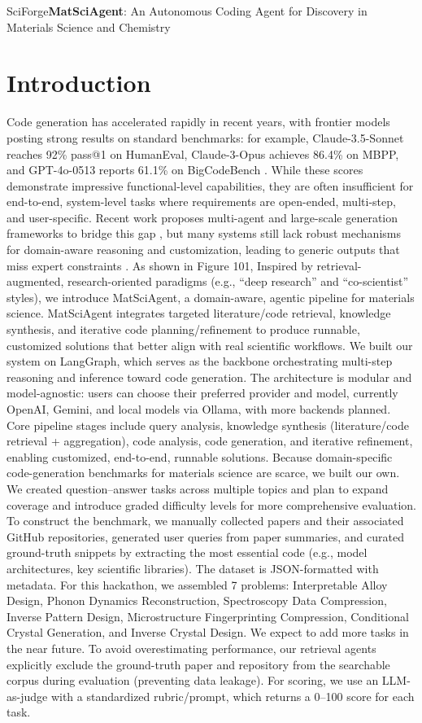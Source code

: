 \begin{teamsubmission}{SciForge}{\textbf{MatSciAgent}: An Autonomous Coding Agent for Discovery in Materials Science and Chemistry}
\section*{Introduction}
Code generation has accelerated rapidly in recent years, with frontier models posting strong results on standard benchmarks: for example, Claude-3.5-Sonnet reaches 92\% pass@1 on HumanEval, Claude-3-Opus achieves 86.4\% on MBPP, and GPT-4o-0513 reports 61.1\% on BigCodeBench \cite{jiang2024survey}. While these scores demonstrate impressive functional-level capabilities, they are often insufficient for end-to-end, system-level tasks where requirements are open-ended, multi-step, and user-specific. Recent work proposes multi-agent and large-scale generation frameworks to bridge this gap \cite{ishibashi2024self}, but many systems still lack robust mechanisms for domain-aware reasoning and customization, leading to generic outputs that miss expert constraints \cite{huang2025deep}. As shown in Figure 101, Inspired by retrieval-augmented, research-oriented paradigms (e.g., “deep research” and “co-scientist” styles), we introduce MatSciAgent, a domain-aware, agentic pipeline for materials science. MatSciAgent integrates targeted literature/code retrieval, knowledge synthesis, and iterative code planning/refinement to produce runnable, customized solutions that better align with real scientific workflows. We built our system on LangGraph, which serves as the backbone orchestrating multi-step reasoning and inference toward code generation. The architecture is modular and model-agnostic: users can choose their preferred provider and model, currently OpenAI, Gemini, and local models via Ollama, with more backends planned. Core pipeline stages include query analysis, knowledge synthesis (literature/code retrieval + aggregation), code analysis, code generation, and iterative refinement, enabling customized, end-to-end, runnable solutions. Because domain-specific code-generation benchmarks for materials science are scarce, we built our own. We created question–answer tasks across multiple topics and plan to expand coverage and introduce graded difficulty levels for more comprehensive evaluation. To construct the benchmark, we manually collected papers and their associated GitHub repositories, generated user queries from paper summaries, and curated ground-truth snippets by extracting the most essential code (e.g., model architectures, key scientific libraries). The dataset is JSON-formatted with metadata. For this hackathon, we assembled 7 problems: Interpretable Alloy Design, Phonon Dynamics Reconstruction, Spectroscopy Data Compression, Inverse Pattern Design, Microstructure Fingerprinting Compression, Conditional Crystal Generation, and Inverse Crystal Design. We expect to add more tasks in the near future. To avoid overestimating performance, our retrieval agents explicitly exclude the ground-truth paper and repository from the searchable corpus during evaluation (preventing data leakage). For scoring, we use an LLM-as-judge with a standardized rubric/prompt, which returns a 0–100 score for each task. 



\end{teamsubmission}
